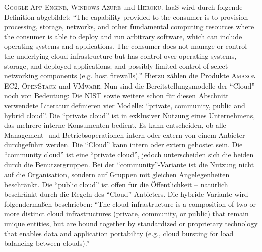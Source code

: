 \textsc{Google App Engine}, \textsc{Windows Azure} und \textsc{Heroku}.\autocite[vgl.][S.\,8]{kumar_reliability_2018} \ac{IaaS} wird durch folgende Definition abgebildet: \enquote{The capability provided to the consumer is to provision processing, storage, networks, and other fundamental computing resources where the consumer is able to deploy and run arbitrary software, which can include operating systems and applications. The consumer does not manage or control the underlying cloud infrastructure but has control over operating systems, storage, and deployed applications; and possibly limited control of select networking components (e.g. host firewalls).}\autocite[][S.\,3]{mell_nist_2011} Hierzu zählen die Produkte \textsc{Amazon EC2}, \textsc{OpenStack} und \textsc{VMware}. Nun sind die Bereitstellungsmodelle der \enquote{Cloud} noch von Bedeutung: Die \ac{NIST} sowie weitere schon für diesen Abschnitt verwendete Literatur definieren vier Modelle: \enquote{private, community, public and hybrid cloud}. Die \enquote{private cloud} ist in exklusiver Nutzung eines Unternehmens, das mehrere interne Konsumenten bedient. Es kann entscheiden, ob alle Management- und Betriebsoperationen intern oder extern von einem Anbieter durchgeführt werden. Die \enquote{Cloud} kann intern oder extern gehostet sein. Die \enquote{community cloud} ist eine \enquote{private cloud}, jedoch unterscheiden sich die beiden durch die Benutzergruppen. Bei der \enquote{community}-Variante ist die Nutzung nicht auf die Organisation, sondern auf Gruppen mit gleichen Angelegenheiten beschränkt. Die \enquote{public cloud} ist offen für die Öffentlichkeit --  natürlich beschränkt durch die Regeln des \enquote{Cloud}-Anbieters. Die hybride Variante wird folgendermaßen beschrieben: \enquote{The cloud infrastructure is a composition of two or more distinct cloud infrastructures (private, community, or public) that remain unique entities, but are bound together by standardized or proprietary technology that enables data and application portability (e.g., cloud bursting for load balancing between clouds).}\autocite[][S.\,3]{mell_nist_2011}


